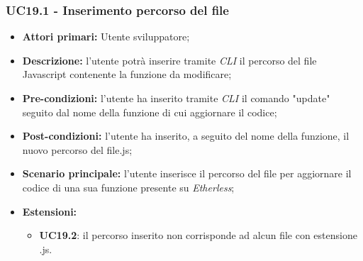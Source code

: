 \subsubsection{UC19.1 - Inserimento percorso del file}
\begin{itemize}
	\item \textbf{Attori primari:} Utente sviluppatore;
	\item \textbf{Descrizione:} l'utente potrà inserire tramite \textit{CLI} il percorso del file Javascript contenente la funzione da modificare; 
	\item \textbf{Pre-condizioni:} l'utente ha inserito tramite \textit{CLI\glo} il comando "update" seguito dal nome della funzione di cui aggiornare il codice;
	\item \textbf{Post-condizioni:} l'utente ha inserito, a seguito del nome della funzione, il nuovo percorso del file.js;
	\item \textbf{Scenario principale:} l'utente inserisce il percorso del file per aggiornare il codice di una sua funzione presente su \textit{Etherless};
	\item \textbf{Estensioni:} 
	\begin{itemize}
		\item \textbf{UC19.2}: il percorso inserito non corrisponde ad alcun file con estensione .js.
	\end{itemize}
\end{itemize}